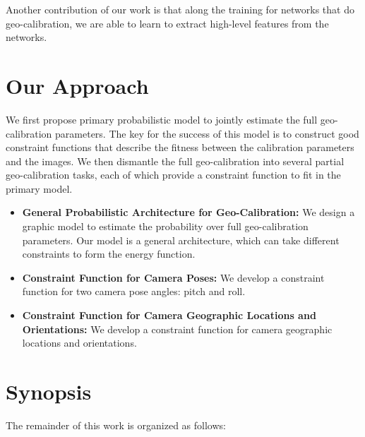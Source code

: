 
Another contribution of our work is that along the training for
networks that do geo-calibration, we are able to learn to extract
high-level features from the networks. 


\section{Our Approach}
We first propose primary probabilistic model to jointly estimate 
the full geo-calibration parameters. The key for the success of this
model is to construct good constraint functions that describe the
fitness between the calibration parameters and the images. We then
dismantle the full geo-calibration into several partial
geo-calibration tasks, each of which provide a constraint function to
fit in the primary model.

\begin{itemize}[noitemsep]
  \item \textbf{General Probabilistic Architecture for Geo-Calibration:}
  We design a graphic model to estimate the probability over
  full geo-calibration parameters. Our model is a general
  architecture, which can take different constraints to form
  the energy function.

  \item \textbf{Constraint Function for Camera Poses:}
  We develop a constraint function for two camera pose angles: pitch
  and roll.

  \item \textbf{Constraint Function for Camera Geographic Locations
  and Orientations:}
  We develop a constraint function for camera geographic locations and
  orientations.

\end{itemize}


\section{Synopsis}

The remainder of this work is organized as follows:
  
